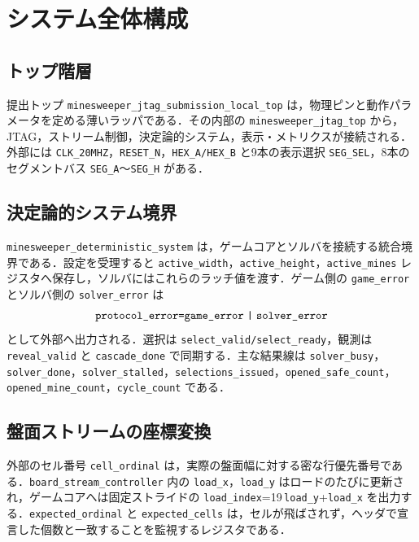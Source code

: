 \chapter{システム全体構成}
\label{ch:architecture}

\section{トップ階層}
提出トップ \texttt{minesweeper\_jtag\_submission\_local\_top} は，物理ピンと動作パラメータを定める薄いラッパである．その内部の \texttt{minesweeper\_jtag\_top} から，JTAG，ストリーム制御，決定論的システム，表示・メトリクスが接続される．外部には \texttt{CLK\_20MHZ}，\texttt{RESET\_N}，\texttt{HEX\_A/HEX\_B} と9本の表示選択 \texttt{SEG\_SEL}，8本のセグメントバス \texttt{SEG\_A}〜\texttt{SEG\_H} がある．

\section{決定論的システム境界}
\texttt{minesweeper\_deterministic\_system} は，ゲームコアとソルバを接続する統合境界である．設定を受理すると \texttt{active\_width}，\texttt{active\_height}，\texttt{active\_mines} レジスタへ保存し，ソルバにはこれらのラッチ値を渡す．ゲーム側の \texttt{game\_error} とソルバ側の \texttt{solver\_error} は
\[
\texttt{protocol\_error=game\_error\;|\;solver\_error}
\]
として外部へ出力される．選択は \texttt{select\_valid/select\_ready}，観測は \texttt{reveal\_valid} と \texttt{cascade\_done} で同期する．主な結果線は \texttt{solver\_busy}，\texttt{solver\_done}，\texttt{solver\_stalled}，\texttt{selections\_issued}，\texttt{opened\_safe\_count}，\texttt{opened\_mine\_count}，\texttt{cycle\_count} である．

\section{盤面ストリームの座標変換}
外部のセル番号 \texttt{cell\_ordinal} は，実際の盤面幅に対する密な行優先番号である．\texttt{board\_stream\_controller} 内の \texttt{load\_x}，\texttt{load\_y} はロードのたびに更新され，ゲームコアへは固定ストライドの \texttt{load\_index}=19\,\texttt{load\_y}+\texttt{load\_x} を出力する．\texttt{expected\_ordinal} と \texttt{expected\_cells} は，セルが飛ばされず，ヘッダで宣言した個数と一致することを監視するレジスタである．

